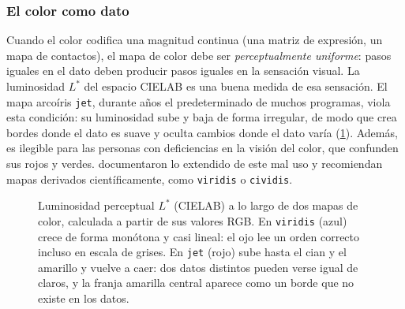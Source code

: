 \subsubsection{El color como dato}

Cuando el color codifica una magnitud continua (una matriz de expresión, un mapa de contactos), el mapa de color debe ser \emph{perceptualmente uniforme}: pasos iguales en el dato deben producir pasos iguales en la sensación visual. La luminosidad $L^\ast$ del espacio CIELAB es una buena medida de esa sensación. El mapa arcoíris \texttt{jet}, durante años el predeterminado de muchos programas, viola esta condición: su luminosidad sube y baja de forma irregular, de modo que crea bordes donde el dato es suave y oculta cambios donde el dato varía (\cref{fig:00-color}). Además, es ilegible para las personas con deficiencias en la visión del color, que confunden sus rojos y verdes. \textcite{c00-crameri2020} documentaron lo extendido de este mal uso y recomiendan mapas derivados científicamente, como \texttt{viridis} o \texttt{cividis}.

\begin{figure}[t]
\centering
{}
\caption[Luminosidad de dos mapas de color]{Luminosidad perceptual $L^\ast$ (CIELAB) a lo largo de dos mapas de color, calculada a partir de sus valores RGB. En \texttt{viridis} (azul) crece de forma monótona y casi lineal: el ojo lee un orden correcto incluso en escala de grises. En \texttt{jet} (rojo) sube hasta el cian y el amarillo y vuelve a caer: dos datos distintos pueden verse igual de claros, y la franja amarilla central aparece como un borde que no existe en los datos.}
\label{fig:00-color}
\end{figure}


